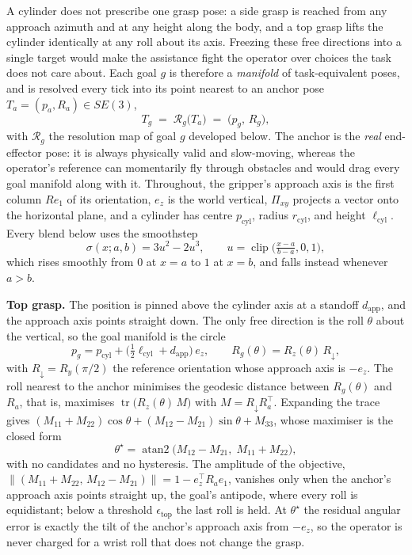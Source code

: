 A cylinder does not prescribe one grasp pose: a side grasp is reached from any approach azimuth and at any height along the body, and a top grasp lifts the cylinder identically at any roll about its axis. Freezing these free directions into a single target would make the assistance fight the operator over choices the task does not care about. Each goal $g$ is therefore a \emph{manifold} of task-equivalent poses, and is resolved every tick into its point nearest to an anchor pose $T_a = (p_a, R_a) \in SE(3)$,
\begin{equation}
T_g \;=\; \mathcal{R}_g\bigl(T_a\bigr) \;=\; \bigl(p_g,\, R_g\bigr),
\label{eq:goalres}
\end{equation}
with $\mathcal{R}_g$ the resolution map of goal $g$ developed below. The anchor is the \emph{real} end-effector pose: it is always physically valid and slow-moving, whereas the operator's reference can momentarily fly through obstacles and would drag every goal manifold along with it. Throughout, the gripper's approach axis is the first column $R e_1$ of its orientation, $e_z$ is the world vertical, $\Pi_{xy}$ projects a vector onto the horizontal plane, and a cylinder has centre $p_{\text{cyl}}$, radius $r_{\text{cyl}}$, and height $\ell_{\text{cyl}}$. Every blend below uses the smoothstep
\begin{equation}
\sigma(x; a, b) = 3u^2 - 2u^3,\qquad u = \operatorname{clip}\!\bigl(\tfrac{x-a}{b-a}, 0, 1\bigr),
\label{eq:smoothstep}
\end{equation}
which rises smoothly from $0$ at $x = a$ to $1$ at $x = b$, and falls instead whenever $a > b$.

\textbf{Top grasp.} The position is pinned above the cylinder axis at a standoff $d_{\text{app}}$, and the approach axis points straight down. The only free direction is the roll $\theta$ about the vertical, so the goal manifold is the circle
\begin{equation}
p_g = p_{\text{cyl}} + \bigl(\tfrac{1}{2}\ell_{\text{cyl}} + d_{\text{app}}\bigr)\,e_z,
\qquad
R_g(\theta) = R_z(\theta)\,R_{\downarrow},
\label{eq:topgoal}
\end{equation}
with $R_{\downarrow} = R_y(\pi/2)$ the reference orientation whose approach axis is $-e_z$. The roll nearest to the anchor minimises the geodesic distance between $R_g(\theta)$ and $R_a$, that is, maximises $\operatorname{tr}\bigl(R_z(\theta)\,M\bigr)$ with $M = R_{\downarrow}R_a^{\top}$. Expanding the trace gives $(M_{11} + M_{22})\cos\theta + (M_{12} - M_{21})\sin\theta + M_{33}$, whose maximiser is the closed form
\begin{equation}
\theta^{\star} = \operatorname{atan2}\bigl(M_{12} - M_{21},\; M_{11} + M_{22}\bigr),
\label{eq:toproll}
\end{equation}
with no candidates and no hysteresis. The amplitude of the objective, $\|(M_{11} + M_{22},\, M_{12} - M_{21})\| = 1 - e_z^{\top}R_a e_1$, vanishes only when the anchor's approach axis points straight up, the goal's antipode, where every roll is equidistant; below a threshold $\epsilon_{\text{top}}$ the last roll is held. At $\theta^{\star}$ the residual angular error is exactly the tilt of the anchor's approach axis from $-e_z$, so the operator is never charged for a wrist roll that does not change the grasp.

